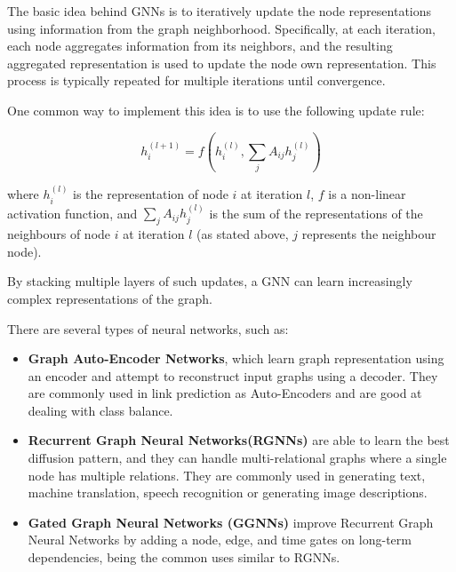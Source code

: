 The basic idea behind \acp{GNN} is to iteratively update the node representations using information from the graph neighborhood. Specifically, at each iteration, each node aggregates information from its neighbors, and the resulting aggregated representation is used to update the node own representation. This process is typically repeated for multiple iterations until convergence. %

One common way to implement this idea is to use the following update rule:

\begin{equation}
h_i^{(l+1)} = f(h_i^{(l)}, \sum_{j} A_{ij} h_j^{(l)})
\end{equation}

where $h_i^{(l)}$ is the representation of node $i$ at iteration $l$, $f$ is a non-linear activation function, and $\sum_{j} A_{ij} h_j^{(l)}$ is the sum of the representations of the neighbours of node $i$ at iteration $l$ (as stated above, $j$ represents the neighbour node).

By stacking multiple layers of such updates, a \ac{GNN} can learn increasingly complex representations of the graph.

There are several types of neural networks, such as:

\begin{itemize}
	
	\item \textbf{Graph Auto-Encoder Networks}, which learn graph representation using an encoder and attempt to reconstruct input graphs using a decoder. They are commonly used in link prediction as Auto-Encoders and are good at dealing with class balance. 
	
	\item \textbf{Recurrent Graph Neural Networks(RGNNs)} are able to learn the best diffusion pattern, and they can handle multi-relational graphs where a single node has multiple relations. They are commonly used in generating text, machine translation, speech recognition or generating image descriptions.
	
	\item \textbf{Gated Graph Neural Networks (GGNNs)} improve Recurrent Graph Neural Networks by adding a node, edge, and time gates on long-term dependencies, being the common uses similar to RGNNs.
	
\end{itemize}

